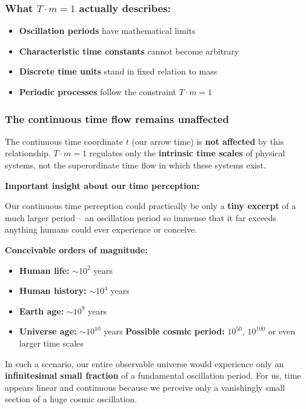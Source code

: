 \documentclass[12pt,a4paper]{article}
\theoremstyle{definition}
\theoremstyle{remark}
\begin{document}
	\subsubsection{What $T \cdot m = 1$ actually describes:}
	\begin{itemize}
		\item \textbf{Oscillation periods} have mathematical limits
		\item \textbf{Characteristic time constants} cannot become arbitrary
		\item \textbf{Discrete time units} stand in fixed relation to mass
		\item \textbf{Periodic processes} follow the constraint $T \cdot m = 1$
	\end{itemize}
	
	\subsubsection{The continuous time flow remains unaffected}
	
	The continuous time coordinate $t$ (our \glqq arrow time\grqq) is \textbf{not affected} by this relationship. $T \cdot m = 1$ regulates only the \textbf{intrinsic time scales} of physical systems, not the superordinate time flow in which these systems exist.
	
	\textbf{Important insight about our time perception:}
	
	Our continuous time perception could practically be only a \textbf{tiny excerpt} of a much larger period -- an oscillation period so immense that it far exceeds anything humans could ever experience or conceive.
	
	\textbf{Conceivable orders of magnitude:}
	\begin{itemize}
		\item \textbf{Human life:} $\sim 10^2$ years
		\item \textbf{Human history:} $\sim 10^4$ years
		\item \textbf{Earth age:} $\sim 10^9$ years
		\item \textbf{Universe age:} $\sim 10^{10}$ years
		\textbf{Possible cosmic period:} $10^{50}$, $10^{100}$ or even larger time scales
	\end{itemize}
	
	In such a scenario, our entire observable universe would experience only an \textbf{infinitesimal small fraction} of a fundamental oscillation period. For us, time appears linear and continuous because we perceive only a vanishingly small section of a huge cosmic \glqq oscillation\grqq.
	
\end{document}

